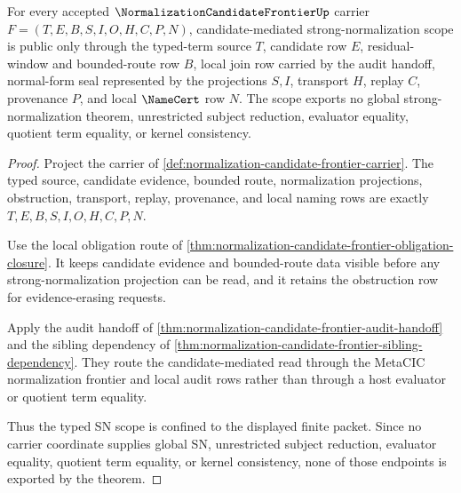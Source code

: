 \begin{theorem}
\label{thm:normalization-candidate-frontier-typed-sn-scope}
For every accepted $\NormalizationCandidateFrontierUp$ carrier $F=(T,E,B,S,I,O,H,C,P,N)$, candidate-mediated strong-normalization scope is public only through the typed-term source $T$, candidate row $E$, residual-window and bounded-route row $B$, local join row carried by the audit handoff, normal-form seal represented by the projections $S,I$, transport $H$, replay $C$, provenance $P$, and local $\NameCert$ row $N$. The scope exports no global strong-normalization theorem, unrestricted subject reduction, evaluator equality, quotient term equality, or kernel consistency.
\end{theorem}
\begin{proof}
Project the carrier of \autoref{def:normalization-candidate-frontier-carrier}. The typed source, candidate evidence, bounded route, normalization projections, obstruction, transport, replay, provenance, and local naming rows are exactly $T,E,B,S,I,O,H,C,P,N$.

Use the local obligation route of \autoref{thm:normalization-candidate-frontier-obligation-closure}. It keeps candidate evidence and bounded-route data visible before any strong-normalization projection can be read, and it retains the obstruction row for evidence-erasing requests.

Apply the audit handoff of \autoref{thm:normalization-candidate-frontier-audit-handoff} and the sibling dependency of \autoref{thm:normalization-candidate-frontier-sibling-dependency}. They route the candidate-mediated read through the MetaCIC normalization frontier and local audit rows rather than through a host evaluator or quotient term equality.

Thus the typed SN scope is confined to the displayed finite packet. Since no carrier coordinate supplies global SN, unrestricted subject reduction, evaluator equality, quotient term equality, or kernel consistency, none of those endpoints is exported by the theorem.
\end{proof}
